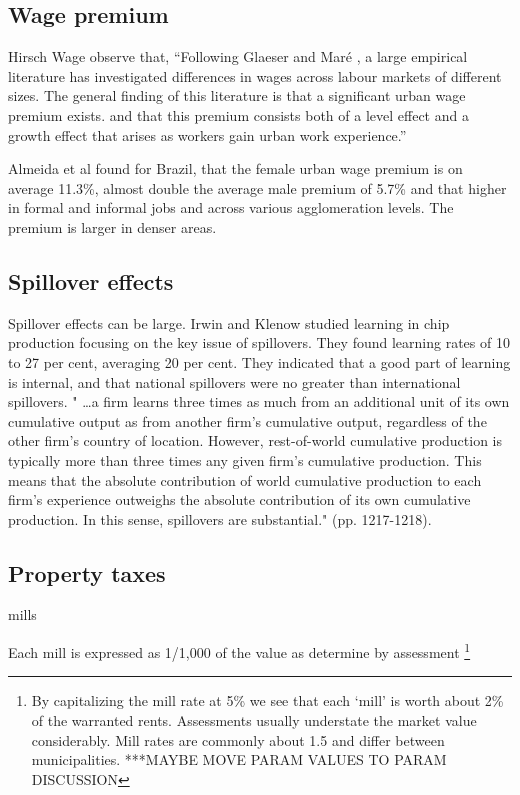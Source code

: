 \subsection{Wage premium} \label{section-wage-premium}

Hirsch Wage \cite{hirschUrbanWagePremium2019} observe that, ``Following Glaeser and Maré \cite{glaeserCitiesSkills2001},  a  large  empirical  literature  has  investigated differences in wages across labour markets of different sizes. The general finding of this literature is that a significant urban wage premium exists. and that this premium consists both of a level effect and a growth effect that arises as workers gain urban work experience.'' 

Almeida et al \cite{almeidaUrbanWagePremium2022} found for Brazil, that the female urban wage premium is on average 11.3\%, almost double the average male premium of 5.7\% and that higher in formal and informal jobs and across various agglomeration levels. The premium is larger in denser areas.

\subsection{Spillover effects} \label{section-spillover}

Spillover effects can be large. Irwin and Klenow  studied learning in chip production focusing  on the key issue of spillovers. They found learning rates of 10 to 27 per cent, averaging 20 per cent. They indicated that a good part of learning is internal, and that national spillovers were no greater than international spillovers. " \dots a firm learns three times as much from an additional unit of its own cumulative output as from another firm's cumulative output, regardless of the other firm's country of location. However, rest-of-world cumulative production is typically more than three times any given firm's cumulative production. This means that the absolute contribution of world cumulative production to each firm's experience outweighs the absolute contribution of its own cumulative production. In this sense, spillovers are substantial." (pp. 1217-1218).


\subsection{Property taxes}

mills

Each mill is expressed as  1/1,000 of the value as determine by assessment \footnote{By capitalizing the mill rate at 5\%  we see that each `mill' is worth about 2\% of the warranted rents. Assessments usually understate the market value considerably. Mill rates are commonly about 1.5 and differ between municipalities. ***MAYBE MOVE PARAM VALUES TO PARAM DISCUSSION}


